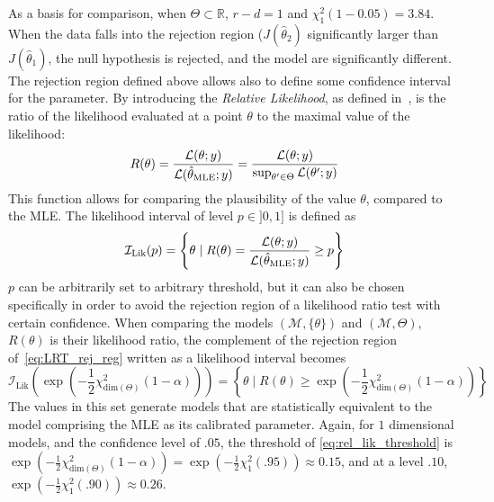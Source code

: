 \documentclass[../../Main_ManuscritThese.tex]{subfiles}
\begin{document}
As a basis for comparison, when $\Theta \subset \mathbb{R}$, $r-d=1$ and $\chi^2_1(1-0.05) =3.84$. When the data falls into the rejection region ($J(\hat{\theta}_2)$ significantly larger than $J(\hat{\theta}_1)$, the null hypothesis is rejected, and the model are significantly different. 
\label{sec:relative_likelihood}
The rejection region defined above allows also to define some confidence interval for the parameter. By introducing the \emph{Relative Likelihood}, as defined in~\cite{kalbfleisch_probability_1985}, is the ratio of the likelihood evaluated at a point $\theta$ to the maximal value of the likelihood:
\begin{equation}
  R(\theta) = \frac{\mathcal{L}(\theta;y)}{\mathcal{L}(\hat{\theta}_{\mathrm{MLE}};y)} = \frac{\mathcal{L}(\theta;y)}{\sup_{\theta^{\prime} \in \Theta}\mathcal{L}(\theta^{\prime};y)}
\end{equation}
This function allows for comparing the plausibility of the value $\theta$, compared to the MLE.
The likelihood interval of level $p\in ]0,1]$ is defined as
\begin{equation}
  \mathcal{I}_{\mathrm{Lik}}(p) = \left\{\theta \mid R(\theta)=\frac{\mathcal{L}(\theta;y)}{\mathcal{L}(\hat{\theta}_{\mathrm{MLE}};y)} \geq p\right\}
\end{equation}
$p$ can be arbitrarily set to arbitrary threshold, but it can also be chosen specifically in order to avoid the rejection region of a likelihood ratio test with certain confidence. When comparing the models $(\mathcal{M}, \{\theta\})$ and $(\mathcal{M},\Theta)$, $R(\theta)$ is their likelihood ratio, the complement of the rejection region of~\cref{eq:LRT_rej_reg} written as a likelihood interval becomes
\begin{equation}
  \label{eq:rel_lik_threshold}
  \mathcal{I}_{\mathrm{Lik}}\left(\exp\left(-\frac{1}{2}\chi^2_{\mathrm{dim}(\Theta)}(1-\alpha)\right)\right) = \left\{\theta \mid R(\theta) \geq \exp\left(-\frac{1}{2}\chi^2_{\mathrm{dim}(\Theta)}(1-\alpha)\right) \right\}
\end{equation}
The values in this set generate models that are statistically equivalent to the model comprising the MLE as its calibrated parameter. Again, for $1$ dimensional models, and the confidence level of $.05$, the threshold of \cref{eq:rel_lik_threshold} is $\exp\left(-\frac{1}{2}\chi^2_{\mathrm{dim}(\Theta)}(1-\alpha)\right) = \exp\left(-\frac{1}{2}\chi^2_{1}(.95)\right) \approx 0.15$, and at a level $.10$, $\exp\left(-\frac{1}{2}\chi^2_{1}(.90)\right) \approx 0.26$.
\end{document}
